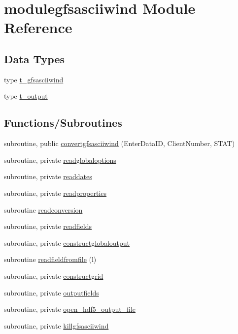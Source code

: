\hypertarget{namespacemodulegfsasciiwind}{}\section{modulegfsasciiwind Module Reference}
\label{namespacemodulegfsasciiwind}
\subsection*{Data Types}
\begin{DoxyCompactItemize}
\item 
type \mbox{\hyperlink{structmodulegfsasciiwind_1_1t__gfsasciiwind}{t\+\_\+gfsasciiwind}}
\item 
type \mbox{\hyperlink{structmodulegfsasciiwind_1_1t__output}{t\+\_\+output}}
\end{DoxyCompactItemize}
\subsection*{Functions/\+Subroutines}
\begin{DoxyCompactItemize}
\item 
subroutine, public \mbox{\hyperlink{namespacemodulegfsasciiwind_a4a4a0dde4375b81a03f64232de2622c5}{convertgfsasciiwind}} (Enter\+Data\+ID, Client\+Number, S\+T\+AT)
\item 
subroutine, private \mbox{\hyperlink{namespacemodulegfsasciiwind_a8c3d7b7c4a1b9cba9c41386d4584b037}{readglobaloptions}}
\item 
subroutine, private \mbox{\hyperlink{namespacemodulegfsasciiwind_ab9051f99673c32b2f6b1020ab37aa9c1}{readdates}}
\item 
subroutine, private \mbox{\hyperlink{namespacemodulegfsasciiwind_a59e80d4f0ead06a644744e644d4504a0}{readproperties}}
\item 
subroutine \mbox{\hyperlink{namespacemodulegfsasciiwind_a2ae7830d5f79fbdaea50e4f86eef0d4b}{readconversion}}
\item 
subroutine, private \mbox{\hyperlink{namespacemodulegfsasciiwind_ac5d334e8c6ff65db3f44823f9a106515}{readfields}}
\item 
subroutine, private \mbox{\hyperlink{namespacemodulegfsasciiwind_a138e1d55d83fe4bc5ba1901ae3adcbb7}{constructglobaloutput}}
\item 
subroutine \mbox{\hyperlink{namespacemodulegfsasciiwind_a69fe620e0a4b751e1ee827c3e8f01e6c}{readfieldfromfile}} (l)
\item 
subroutine, private \mbox{\hyperlink{namespacemodulegfsasciiwind_a794951032db573702ba8cfba3fe3f55b}{constructgrid}}
\item 
subroutine, private \mbox{\hyperlink{namespacemodulegfsasciiwind_ab51247b85cb09b0446fe50076953724a}{outputfields}}
\item 
subroutine, private \mbox{\hyperlink{namespacemodulegfsasciiwind_ac0e8ece9bfc11aa5ca290d333ad96a29}{open\+\_\+hdf5\+\_\+output\+\_\+file}}
\item 
subroutine, private \mbox{\hyperlink{namespacemodulegfsasciiwind_af8a728ba2b355e73d4c07f7d2a55c500}{killgfsasciiwind}}
\end{DoxyCompactItemize}
